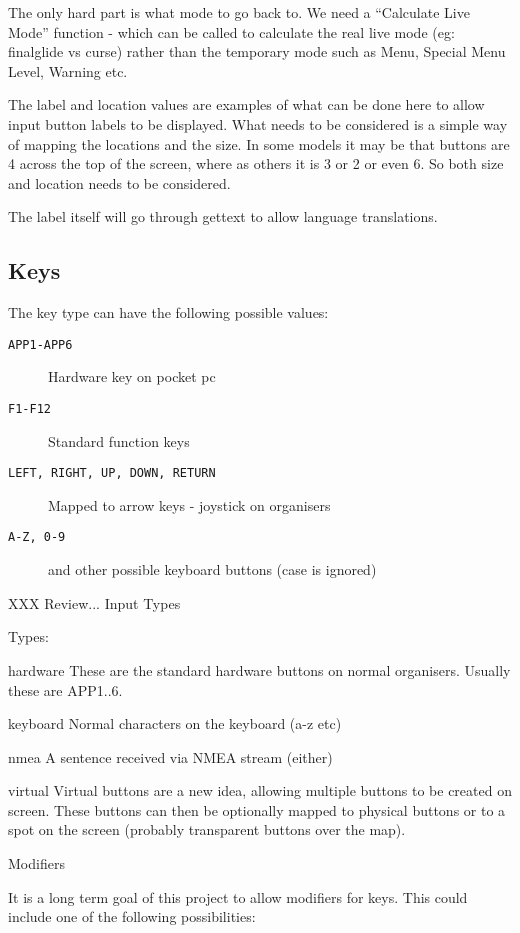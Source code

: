 The only hard part is what mode to go back to. We need a 
``Calculate Live Mode'' function - which can be called to calculate the
real live mode (eg: finalglide vs curse) rather than the temporary
mode such as Menu, Special Menu Level, Warning etc.

The label and location values are examples of what can be done here
to allow input button labels to be displayed. What needs to be 
considered is a simple way of mapping the locations and the size.
In some models it may be that buttons are 4 across the top of the
screen, where as others it is 3 or 2 or even 6. So both size and
location needs to be considered.

The label itself will go through gettext to allow language
translations.

\subsection{Keys}

The key type can have the following possible values:

\begin{description}
\item[\texttt{APP1-APP6}] Hardware key on pocket pc
\item[\texttt{F1-F12}] Standard function keys
\item[\texttt{LEFT, RIGHT, UP, DOWN, RETURN}] Mapped to arrow keys - joystick on
  organisers
\item[\texttt{A-Z, 0-9}] and other possible keyboard buttons (case is ignored)
\end{description}


XXX Review...
Input Types

Types:

hardware	These are the standard hardware buttons 
on normal organisers. Usually these are
APP1..6.

keyboard	Normal characters on the keyboard (a-z etc)

nmea		A sentence received via NMEA stream (either)

virtual		Virtual buttons are a new idea, allowing
multiple buttons to be created on screen.
These buttons can then be optionally mapped
to physical buttons or to a spot on the 
screen (probably transparent buttons over 
the map).

Modifiers

It is a long term goal of this project to allow modifiers for keys.
This could include one of the following possibilities:

